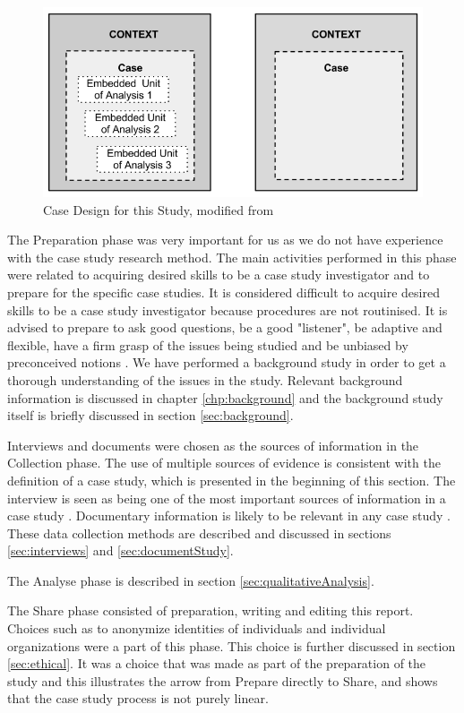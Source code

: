 \begin{figure}[ht]
\begin{center}
\includegraphics[scale=0.685]{caseStructure.png}
\caption[Case Design for this Study]{Case Design for this Study, modified from \cite{CaseStudyResearch}}
\label{fig:caseDesign}
\end{center}
\end{figure}

The Preparation phase was very important for us as we do not have experience with the case study research method. The main activities performed in this phase were related to acquiring desired skills to be a case study investigator and to prepare for the specific case studies. It is considered difficult to acquire desired skills to be a case study investigator because procedures are not routinised. It is advised to prepare to ask good questions, be a good "listener", be adaptive and flexible, have a firm grasp of the issues being studied and be unbiased by preconceived notions \cite{CaseStudyResearch}. We have performed a background study in order to get a thorough understanding of the issues in the study. Relevant background information is discussed in chapter \ref{chp:background} and the background study itself is briefly discussed in section \ref{sec:background}. %

Interviews and documents were chosen as the sources of information in the Collection phase. The use of multiple sources of evidence is consistent with the definition of a case study, which is presented in the beginning of this section. The interview is seen as being one of the most important sources of information in a case study \cite{CaseStudyResearch}. Documentary information is likely to be relevant in any case study \cite{CaseStudyResearch}. These data collection methods are described and discussed in sections \ref{sec:interviews} and \ref{sec:documentStudy}.

The Analyse phase is described in section \ref{sec:qualitativeAnalysis}.

The Share phase consisted of preparation, writing and editing this report. Choices such as to anonymize identities of individuals and individual organizations were a part of this phase. This choice is further discussed in section \ref{sec:ethical}. It was a choice that was made as part of the preparation of the study and this illustrates the arrow from Prepare directly to Share, and shows that the case study process is not purely linear. 